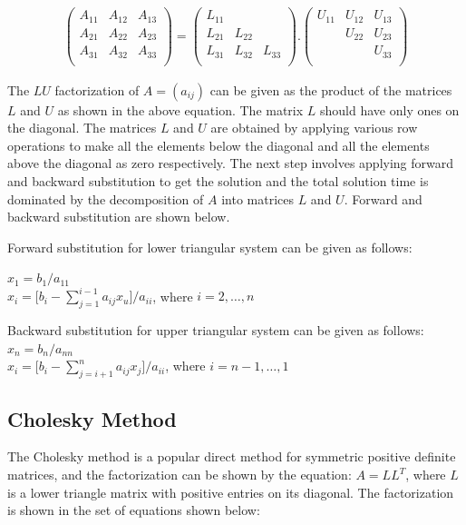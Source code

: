 \begin{gather} %
\begin{pmatrix}
A_{11} & A_{12} & A_{13} \\
A_{21} & A_{22} & A_{23} \\
A_{31} & A_{32} & A_{33} \\
\end{pmatrix} 
=
\begin{pmatrix}
L_{11} & &  \\
L_{21} & L_{22} &  \\
L_{31} & L_{32} & L_{33} \\
\end{pmatrix}
.
\begin{pmatrix}
U_{11} & U_{12} & U_{13} \\
& U_{22} & U_{23} \\
&  & U_{33} \\
\end{pmatrix}
\end{gather}


The $LU$ factorization of $A = (a_{ij})$ can be given as the product of the matrices $L$ and $U$ as shown in the above equation. The matrix $L$ should have only ones on the diagonal. The matrices $L$ and $U$ are obtained by applying various row operations to make all the elements below the diagonal and all the elements above the diagonal as zero respectively. The next step involves applying forward and backward substitution to get the solution and the total solution time is dominated by the decomposition of $A$ into matrices $L$ and $U$. Forward and backward substitution are shown below.

Forward substitution for lower triangular system can be given as follows: \\
\begin{center}
$x_{1} = b_{1}/a_{11}$ \\
$x_{i} = \lbrack b_{i} - \sum_{j=1}^{i-1} a_{ij} x_{u} \rbrack / a_{ii}$, where $i = 2, \ldots, n$

Backward substitution for upper triangular system can be given as follows:
\\
$x_{n} = b_{n}/a_{nn}$ \\
$x_{i} = \lbrack b_{i} - \sum_{j=i+1}^{n} a_{ij} x_{j} \rbrack / a_{ii}$, where $i = n-1, \ldots, 1$
\end{center}


\subsection{Cholesky Method}
The Cholesky method is a popular direct method for symmetric positive definite matrices, and the factorization can be shown by the equation:
$A = LL^{T}$, where $L$ is a lower triangle matrix with positive entries on its diagonal. The factorization is shown in the set of equations shown below:

